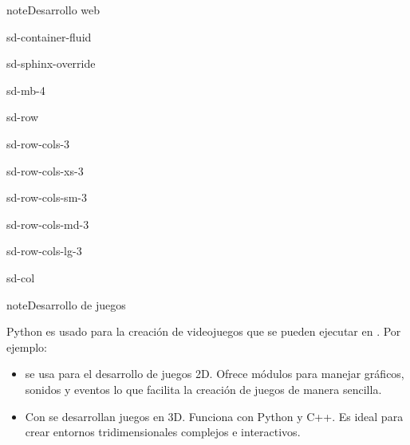 \documentclass[letterpaper,10pt,spanish]{sphinxmanual}
\begin{document}
\begin{sphinxadmonition}{note}{Desarrollo web}
\begin{sphinxuseclass}{sd-container-fluid}
\begin{sphinxuseclass}{sd-sphinx-override}
\begin{sphinxuseclass}{sd-mb-4}
\begin{sphinxuseclass}{sd-row}
\begin{sphinxuseclass}{sd-row-cols-3}
\begin{sphinxuseclass}{sd-row-cols-xs-3}
\begin{sphinxuseclass}{sd-row-cols-sm-3}
\begin{sphinxuseclass}{sd-row-cols-md-3}
\begin{sphinxuseclass}{sd-row-cols-lg-3}
\begin{sphinxuseclass}{sd-col}
\end{sphinxuseclass}
\end{sphinxuseclass}
\end{sphinxuseclass}
\end{sphinxuseclass}
\end{sphinxuseclass}
\end{sphinxuseclass}
\end{sphinxuseclass}
\end{sphinxuseclass}
\end{sphinxuseclass}
\end{sphinxuseclass}\end{sphinxadmonition}

\begin{sphinxadmonition}{note}{Desarrollo de juegos}

\sphinxAtStartPar
Python es usado para la creación de videojuegos que se pueden ejecutar en . Por ejemplo:
\begin{itemize}
\item {} 
\sphinxAtStartPar
{} se usa para el desarrollo de juegos 2D. Ofrece módulos para manejar gráficos, sonidos y eventos lo que facilita la creación de juegos de manera sencilla.

\item {} 
\sphinxAtStartPar
Con  se desarrollan juegos en 3D. Funciona con Python y C++. Es ideal para crear entornos tridimensionales complejos e interactivos.

\end{itemize}


\end{sphinxadmonition}
\end{document}
